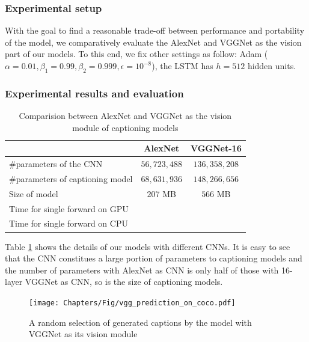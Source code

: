 \begin{itemize}
\subsubsection{Experimental setup}
With the goal to find a reasonable trade-off between performance and portability of the model, we comparatively evaluate the AlexNet \cite{NIPS2012_4824} and VGGNet \cite{Simonyan14c} as the vision part of our models. To this end, we fix other settings as follow: Adam ($\alpha = 0.01, \beta_1 = 0.99, \beta_2 = 0.999, \epsilon = 10^{-8}$), the LSTM has $h = 512$ hidden units.

\subsubsection{Experimental results and evaluation}

	\begin{table}
		\centering
		\caption{Comparision between AlexNet and VGGNet as the vision module of captioning models}
		\label{tab:cnn_compare}

		\begin{tabular}{l{2cm}cc}
			\toprule
				& \textbf{AlexNet} & \textbf{VGGNet-16} \\
			\midrule
			\#parameters of the CNN & $56,723,488$ & $136,358,208$\\
			\#parameters of captioning model & $68,631,936$ & $148,266,656$ \\
			Size of model & $207$ MB & $566$ MB\\
			\midrule
			Time for single forward on GPU & & \\
			Time for single forward on CPU & & \\
			\bottomrule
		\end{tabular}
	\end{table}

Table \ref{tab:cnn_compare} shows the details of our models with different CNNs. It is easy to see that the CNN constitues a large portion of parameters to captioning models and the number of parameters with AlexNet as CNN is only half of those with 16-layer VGGNet as CNN, so is the size of captioning models.

\begin{figure}
	\centering
	\texttt{[image: Chapters/Fig/vgg\_prediction\_on\_coco.pdf]}
	\caption{A random selection of generated captions by the model with VGGNet as its vision module}
	\label{fig:vgg_captions}
\end{figure}


\end{itemize}
